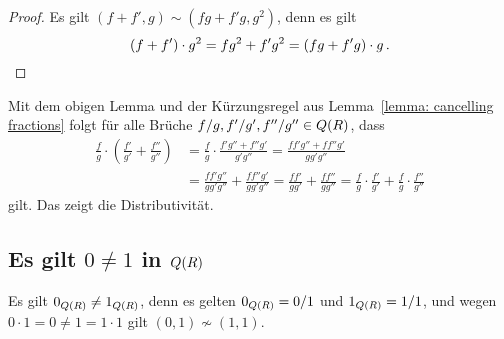\begin{proof}
  Es gilt $(f + f', g) \sim (f g + f' g, g^2)$, denn es gilt
  \[
      (f + f') \cdot g^2
    = f g^2 + f' g^2
    = (f g + f' g) \cdot g \,.
  \qedhere
  \]
\end{proof}

Mit dem obigen Lemma und der Kürzungsregel aus Lemma~\ref{lemma: cancelling fractions} folgt für alle Brüche $f/g, f'/g', f''/g'' \in Q(R)$, dass
\begin{align*}
      \frac{f}{g} \cdot \left( \frac{f'}{g'} + \frac{f''}{g''} \right)
  &=  \frac{f}{g} \cdot \frac{f' g'' + f'' g'}{g' g''}
   =  \frac{f f' g'' + f f'' g'}{g g' g''}  \\
  &=  \frac{f f' g''}{g g' g''} + \frac{f f'' g'}{g g' g''}
   =  \frac{f f'}{g g'} + \frac{f f''}{g g''}
   =  \frac{f}{g} \cdot \frac{f'}{g'} + \frac{f}{g} \cdot \frac{f''}{g''}
\end{align*}
gilt.
Das zeigt die Distributivität.





\subsection*{Es gilt $0 \neq 1$ in $Q(R)$}

Es gilt $0_{Q(R)} \neq 1_{Q(R)}$, denn es gelten $0_{Q(R)} = 0/1$ und $1_{Q(R)} = 1/1$, und wegen $0 \cdot 1 = 0 \neq 1 = 1 \cdot 1$ gilt $(0,1) \nsim (1,1)$.

